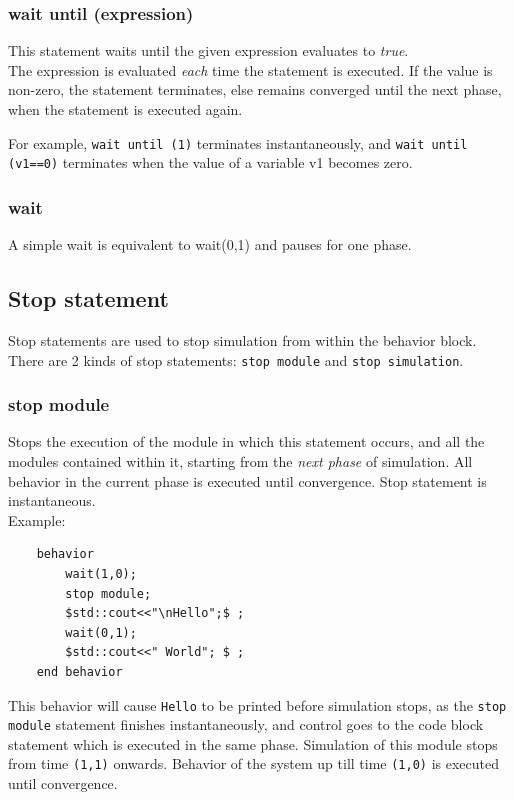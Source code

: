 \documentclass[12pt,a4paper]{report}
\begin{document}
	\subsubsection{wait until (expression)}

	This statement waits until the given expression evaluates to \emph{true}.\\

	The expression is evaluated \emph{each} time the statement is executed. If the value is non-zero,
	the statement terminates, else remains converged until the next phase, when the statement is executed again.

	For example, \texttt{wait until (1)} terminates instantaneously, and \texttt{wait until (v1==0)}
	terminates when the value of a variable v1 becomes zero.



	\subsubsection{wait}
	A simple wait is equivalent to wait(0,1) and pauses for one phase.

	
	
	
	
	\subsection{Stop statement}
	Stop statements are used to stop simulation from within the
	behavior block. There are 2 kinds of stop statements: 
	\texttt{stop module} and \texttt{stop simulation}.

	\subsubsection{stop module}
	Stops the execution of the module in which
	this statement occurs, and all the modules contained within it,
	starting from the \emph{next phase} of simulation. All behavior in the
	current phase is executed until convergence.
	Stop statement is instantaneous.\\
	Example:
	\begin{verbatim}
	behavior 
		wait(1,0);
		stop module;
		$std::cout<<"\nHello";$ ;
		wait(0,1);
		$std::cout<<" World"; $ ;
	end behavior
	\end{verbatim}
	This behavior will cause \texttt{Hello} to be printed before simulation
	stops, as the \texttt{stop module} statement finishes instantaneously,
	and control goes to the code block statement which is executed in the
	same phase.  Simulation of this module stops from time \texttt{(1,1)}
	onwards.  Behavior of the system up till time \texttt{(1,0)} is
	executed until convergence.
	
\end{document}
